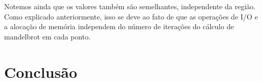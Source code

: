 \documentclass[12pt]{article}
\begin{document}
\begin{figure}[H]
\end{figure}
\begin{figure}[H]
\end{figure}
\begin{figure}[H]
\end{figure}

Notemos ainda que os valores também são semelhantes, independente da região. Como explicado anteriormente, isso se deve ao fato de que as operações de I/O e a alocação de memória independem do número de iterações do cálculo de mandelbrot em cada ponto.


\newpage
\section{Conclusão}
\newpage
\end{document}
